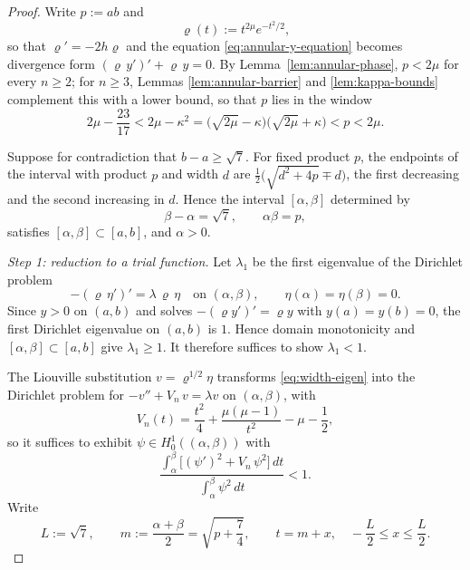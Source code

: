 \documentclass[11pt]{article}
\numberwithin{equation}{section}
\theoremstyle{definition}
\begin{document}
\begin{proof}
Write $p:=ab$ and
\[
    \varrho(t):=t^{2\mu}e^{-t^2/2},
\]
so that $\varrho'=-2h\varrho$ and the equation \eqref{eq:annular-y-equation} becomes divergence form $(\varrho\,y')'+\varrho\,y=0$. By Lemma~\ref{lem:annular-phase}, $p<2\mu$ for every $n\geq2$; for $n\geq3$, Lemmas \ref{lem:annular-barrier} and \ref{lem:kappa-bounds} complement this with a lower bound, so that $p$ lies in the window
\begin{equation}\label{eq:product-window}
    2\mu-\frac{23}{17}
    <2\mu-\kappa^2
    =\bigl(\sqrt{2\mu}-\kappa\bigr)\bigl(\sqrt{2\mu}+\kappa\bigr)
    <p<2\mu.
\end{equation}

Suppose for contradiction that $b-a\geq\sqrt7$. For fixed product $p$, the endpoints of the interval with product $p$ and width $d$ are $\frac12\bigl(\sqrt{d^2+4p}\mp d\bigr)$, the first decreasing and the second increasing in $d$. Hence the interval $[\alpha,\beta]$ determined by
\[
    \beta-\alpha=\sqrt7,
    \qquad
    \alpha\beta=p,
\]
satisfies $[\alpha,\beta]\subset[a,b]$, and $\alpha>0$.

\emph{Step 1: reduction to a trial function.} Let $\lambda_1$ be the first eigenvalue of the Dirichlet problem
\begin{equation}\label{eq:width-eigen}
    -(\varrho\,\eta')'=\lambda\,\varrho\,\eta
    \quad\text{on }(\alpha,\beta),
    \qquad
    \eta(\alpha)=\eta(\beta)=0.
\end{equation}
Since $y>0$ on $(a,b)$ and solves $-(\varrho y')'=\varrho y$ with $y(a)=y(b)=0$, the first Dirichlet eigenvalue on $(a,b)$ is $1$. Hence domain monotonicity and $[\alpha,\beta]\subset[a,b]$ give $\lambda_1\geq1$. It therefore suffices to show $\lambda_1<1$.

The Liouville substitution $v=\varrho^{1/2}\eta$ transforms \eqref{eq:width-eigen} into the Dirichlet problem for $-v''+V_n\,v=\lambda v$ on $(\alpha,\beta)$, with
\begin{equation}\label{eq:width-potential}
    V_n(t)=\frac{t^2}{4}+\frac{\mu(\mu-1)}{t^2}-\mu-\frac12,
\end{equation}
so it suffices to exhibit $\psi\in H^1_0((\alpha,\beta))$ with
\begin{equation}\label{eq:width-rayleigh}
    \frac{\displaystyle\int_\alpha^\beta\bigl[(\psi')^2+V_n\,\psi^2\bigr]\,dt}
         {\displaystyle\int_\alpha^\beta\psi^2\,dt}<1 .
\end{equation}
Write
\[
    L:=\sqrt7,
    \qquad
    m:=\frac{\alpha+\beta}2=\sqrt{p+\frac74},
    \qquad
    t=m+x,
    \quad
    -\frac L2\leq x\leq\frac L2 .
\]


\end{proof}
\end{document}
